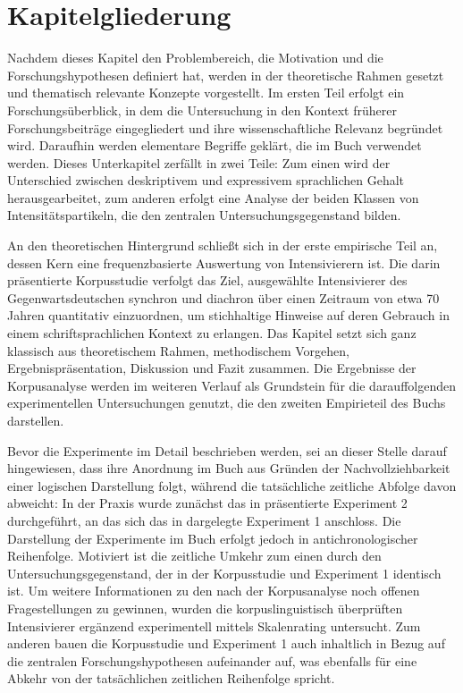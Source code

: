 \section{Kapitelgliederung}\label{abs:gliederung}
Nachdem dieses Kapitel den Problembereich, die Motivation und die Forschungshypothesen definiert hat, werden in  der theoretische Rahmen gesetzt und thematisch relevante Konzepte vorgestellt. Im ersten Teil erfolgt ein Forschungsüberblick, in dem die Untersuchung in den Kontext früherer Forschungsbeiträge eingegliedert und ihre wissenschaftliche Relevanz begründet wird. Daraufhin werden elementare Begriffe geklärt, die im Buch verwendet werden. Dieses Unterkapitel zerfällt in zwei Teile: Zum einen wird der Unterschied zwischen deskriptivem und expressivem sprachlichen Gehalt herausgearbeitet, zum anderen erfolgt eine Analyse der beiden Klassen von Intensitätspartikeln, die den zentralen {Untersuchungsgegenstand bilden}.

An den theoretischen Hintergrund schließt sich in  der erste empirische Teil an, dessen Kern eine frequenzbasierte Auswertung von Intensivierern ist. Die darin präsentierte Korpusstudie verfolgt das Ziel, ausgewählte Intensivierer des Gegenwartsdeutschen synchron und diachron über einen Zeitraum von etwa 70 Jahren quantitativ einzuordnen, um stichhaltige Hinweise auf deren Gebrauch in einem schriftsprachlichen Kontext zu erlangen. Das Kapitel setzt sich ganz klassisch aus theoretischem Rahmen, methodischem Vorgehen, Ergebnispräsentation, Diskussion und Fazit zusammen. Die Ergebnisse der Korpusanalyse werden im weiteren Verlauf als Grundstein für die darauffolgenden experimentellen Untersuchungen genutzt, die den zweiten Empirieteil des Buchs darstellen.

Bevor die Experimente im Detail beschrieben werden, sei an dieser Stelle darauf hingewiesen, dass ihre Anordnung im Buch aus Gründen der Nachvollziehbarkeit einer logischen Darstellung folgt, während die tatsächliche zeitliche Abfolge davon abweicht: In der Praxis wurde zunächst das in {} präsentierte Experiment 2 durchgeführt, an das sich das in {} dargelegte Experiment 1 anschloss. Die Darstellung der Experimente im Buch erfolgt jedoch in antichronologischer Reihenfolge. Motiviert ist die zeitliche Umkehr zum einen durch den Untersuchungsgegenstand, der in der Korpusstudie und Experiment 1 identisch ist. Um weitere Informationen zu den nach der Korpusanalyse noch offenen Fragestellungen zu gewinnen, wurden die korpuslinguistisch überprüften Intensivierer ergänzend experimentell mittels Skalenrating untersucht. Zum anderen bauen die Korpusstudie und Experiment 1 auch inhaltlich in Bezug auf die zentralen Forschungshypothesen aufeinander auf, was ebenfalls für eine Abkehr von der tatsächlichen zeitlichen Reihenfolge spricht.

